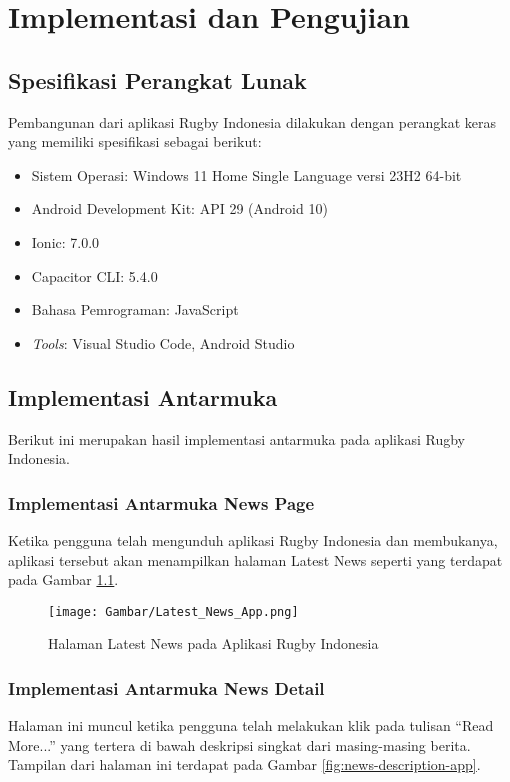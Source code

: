 \chapter{Implementasi dan Pengujian}
\label{chap:implementasi-dan-pengujian}

\section{Spesifikasi Perangkat Lunak}
Pembangunan dari aplikasi Rugby Indonesia dilakukan dengan perangkat keras yang memiliki spesifikasi sebagai berikut:
\begin{itemize}
    \item Sistem Operasi: Windows 11 Home Single Language versi 23H2 64-bit
    \item Android Development Kit: API 29 (Android 10)
    \item Ionic: 7.0.0
    \item Capacitor CLI: 5.4.0
    \item Bahasa Pemrograman: JavaScript
    \item \textit{Tools}: Visual Studio Code, Android Studio
\end{itemize}

\section{Implementasi Antarmuka}
Berikut ini merupakan hasil implementasi antarmuka pada aplikasi Rugby Indonesia.
\subsection{Implementasi Antarmuka News Page}
Ketika pengguna telah mengunduh aplikasi Rugby Indonesia dan membukanya, aplikasi tersebut akan menampilkan halaman Latest News seperti yang terdapat pada Gambar \ref{fig:latest-news-app}.

\begin{figure} [H]
    \centering
    \texttt{[image: Gambar/Latest\_News\_App.png]}
    \caption{Halaman Latest News pada Aplikasi Rugby Indonesia}
    \label{fig:latest-news-app}
\end{figure}

\subsection{Implementasi Antarmuka News Detail}
Halaman ini muncul ketika pengguna telah melakukan klik pada tulisan ``Read More...'' yang tertera di bawah deskripsi singkat dari masing-masing berita. Tampilan dari halaman ini terdapat pada Gambar \ref{fig:news-description-app}.

